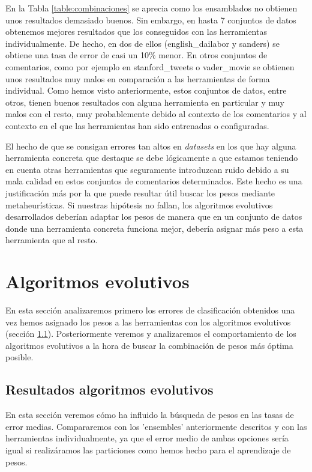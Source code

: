 En la Tabla \ref{table:combinaciones} se aprecia como los ensamblados no obtienen unos resultados demasiado buenos. Sin embargo, en hasta 7 conjuntos de datos obtenemos mejores resultados que los conseguidos con las herramientas individualmente. De hecho, en dos de ellos (english\_dailabor y sanders) se obtiene una tasa de error de casi un 10\% menor. En otros conjuntos de comentarios, como por ejemplo en stanford\_tweets o vader\_movie se obtienen unos resultados muy malos en comparación a las herramientas de forma individual. Como hemos visto anteriormente, estos conjuntos de datos, entre otros, tienen buenos resultados con alguna herramienta en particular y muy malos con el resto, muy probablemente debido al contexto de los comentarios y al contexto en el que las herramientas han sido entrenadas o configuradas.

El hecho de que se consigan errores tan altos en \textit{datasets} en los que hay alguna herramienta concreta que destaque se debe lógicamente a que estamos teniendo en cuenta otras herramientas que seguramente introduzcan ruido debido a su mala calidad en estos conjuntos de comentarios determinados. Este hecho es una justificación más por la que puede resultar útil buscar los pesos mediante metaheurísticas. Si nuestras hipótesis no fallan, los algoritmos evolutivos desarrollados deberían adaptar los pesos de manera que en un conjunto de datos donde una herramienta concreta funciona mejor, debería asignar más peso a esta herramienta que al resto.
\section{Algoritmos evolutivos} \label{evo}
En esta sección analizaremos primero los errores de clasificación obtenidos una vez hemos asignado los pesos a las herramientas con los algoritmos evolutivos (sección \ref{algorresults}). Posteriormente veremos y analizaremos el comportamiento de los algoritmos evolutivos a la hora de buscar la combinación de pesos más óptima posible.

\subsection{Resultados algoritmos evolutivos} \label{algorresults}
En esta sección veremos cómo ha influido la búsqueda de pesos en las tasas de error medias. Compararemos con los 'ensembles' anteriormente descritos y con las herramientas individualmente, ya que el error medio de ambas opciones sería igual si realizáramos las particiones como hemos hecho para el aprendizaje de pesos.

